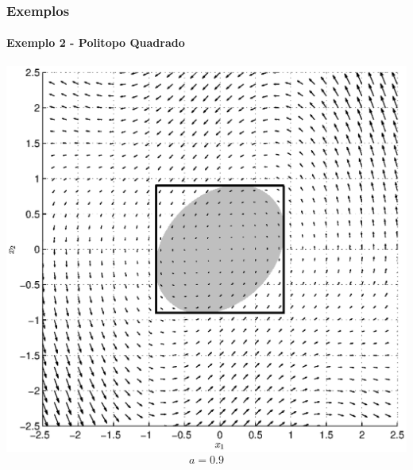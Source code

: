 \documentclass{beamer}
\begin{document}
\begin{frame}\frametitle{Exemplos}\framesubtitle{Exemplo 2 - Politopo Quadrado}
  \centering
  \includegraphics[height=0.7\textheight]{exemplo2_quadrado_8.eps}
  \begin{equation}
    a = \num{0.9}
  \end{equation}
\end{frame}

{
}
\end{document}
